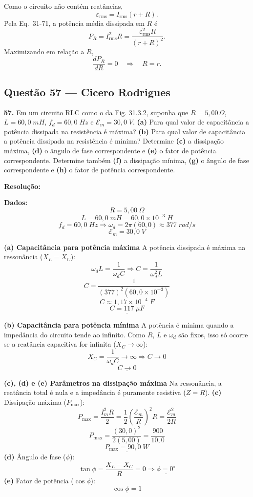 \documentclass[12pt,a4paper]{article}
\begin{document}
Como o circuito não contém reatâncias,
\[
\varepsilon_{\mathrm{rms}} = I_{\mathrm{rms}}(r+R).
\]
Pela Eq.~31-71, a potência média dissipada em $R$ é
\[
P_R = I_{\mathrm{rms}}^2R = \frac{\varepsilon_{\mathrm{rms}}^2R}{(r+R)^2}.
\]
Maximizando em relação a $R$,
\[
\frac{dP_R}{dR}=0 \quad\Rightarrow\quad R=r.
\]

\subsection{Questão 57 — Cicero Rodrigues}
 
\textbf{57. }\normalfont Em um circuito RLC como o da Fig. 31.3.2, suponha que \(R = 5,00\,\Omega\), \(L = 60,0\;mH\), \(f_d = 60,0\;Hz\) e \(\mathcal{E}_m = 30,0\;V\). \textbf{(a)} Para qual valor de capacitância a potência dissipada na resistência é máxima? \textbf{(b)} Para qual valor de capacitância a potência dissipada na resistência é mínima? Determine \textbf{(c)} a dissipação máxima, \textbf{(d)} o ângulo de fase correspondente e \textbf{(e)} o fator de potência correspondente. Determine também \textbf{(f)} a dissipação mínima, \textbf{(g)} o ângulo de fase correspondente e \textbf{(h)} o fator de potência correspondente.

\textbf{Resolução:}
\vspace{0.3cm}

\textbf{Dados:}
\[R = 5,00\;\Omega\]
\[L = 60,0\;mH = 60,0 \times 10^{-3}\;H\]
\[f_d = 60,0\;Hz \Rightarrow \omega_d = 2\pi(60,0) \approx 377\;rad/s\]
\[\mathcal{E}_m = 30,0\;V\]

\vspace{0.2cm}
\textbf{(a) Capacitância para potência máxima}
A potência dissipada é máxima na ressonância (\(X_L = X_C\)):
\[\omega_d L = \frac{1}{\omega_d C} \Rightarrow C = \frac{1}{\omega_d^2 L}\]
\[C = \frac{1}{(377)^2 (60,0 \times 10^{-3})}\]
\[C \approx 1,17 \times 10^{-4}\;F\]
\[\underline{C = 117\;\mu F}\]

\vspace{0.2cm}
\textbf{(b) Capacitância para potência mínima}
A potência é mínima quando a impedância do circuito tende ao infinito. Como \(R\), \(L\) e \(\omega_d\) são fixos, isso só ocorre se a reatância capacitiva for infinita (\(X_C \to \infty\)):
\[X_C = \frac{1}{\omega_d C} \to \infty \Rightarrow C \to 0\]
\[\underline{C \to 0}\]

\vspace{0.2cm}
\textbf{(c), (d) e (e) Parâmetros na dissipação máxima}
Na ressonância, a reatância total é nula e a impedância é puramente resistiva (\(Z = R\)).
\textbf{(c)} Dissipação máxima (\(P_{\max}\)):
\[P_{\max} = \frac{I_m^2 R}{2} = \frac{1}{2} \left(\frac{\mathcal{E}_m}{R}\right)^2 R = \frac{\mathcal{E}_m^2}{2R}\]
\[P_{\max} = \frac{(30,0)^2}{2(5,00)} = \frac{900}{10,0}\]
\[\underline{P_{\max} = 90,0\;W}\]
\textbf{(d)} Ângulo de fase (\(\phi\)):
\[\tan\phi = \frac{X_L - X_C}{R} = 0 \Rightarrow \underline{\phi = 0^\circ}\]
\textbf{(e)} Fator de potência (\(\cos\phi\)):
\[\underline{\cos\phi = 1}\]
\end{document}
